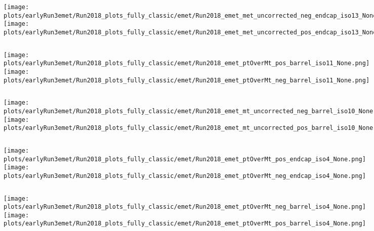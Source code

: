 \documentclass[en,16:9,navbarinfooter]{presentation/sdqbeamer}
\begin{document}
\begin{frame}{\insertsubsection}
   \begin{columns}
   \texttt{[image: plots/earlyRun3emet/Run2018\_plots\_fully\_classic/emet/Run2018\_emet\_met\_uncorrected\_neg\_endcap\_iso13\_None.png]}
   \texttt{[image: plots/earlyRun3emet/Run2018\_plots\_fully\_classic/emet/Run2018\_emet\_met\_uncorrected\_pos\_endcap\_iso13\_None.png]}
\end{columns}
\end{frame}

\begin{frame}{\insertsubsection}
   \begin{columns}
   \texttt{[image: plots/earlyRun3emet/Run2018\_plots\_fully\_classic/emet/Run2018\_emet\_ptOverMt\_pos\_barrel\_iso11\_None.png]}
   \texttt{[image: plots/earlyRun3emet/Run2018\_plots\_fully\_classic/emet/Run2018\_emet\_ptOverMt\_neg\_barrel\_iso11\_None.png]}
\end{columns}
\end{frame}

\begin{frame}{\insertsubsection}
   \begin{columns}
   \texttt{[image: plots/earlyRun3emet/Run2018\_plots\_fully\_classic/emet/Run2018\_emet\_mt\_uncorrected\_neg\_barrel\_iso10\_None.png]}
   \texttt{[image: plots/earlyRun3emet/Run2018\_plots\_fully\_classic/emet/Run2018\_emet\_mt\_uncorrected\_pos\_barrel\_iso10\_None.png]}
\end{columns}
\end{frame}

\begin{frame}{\insertsubsection}
   \begin{columns}
   \texttt{[image: plots/earlyRun3emet/Run2018\_plots\_fully\_classic/emet/Run2018\_emet\_ptOverMt\_pos\_endcap\_iso4\_None.png]}
   \texttt{[image: plots/earlyRun3emet/Run2018\_plots\_fully\_classic/emet/Run2018\_emet\_ptOverMt\_neg\_endcap\_iso4\_None.png]}
\end{columns}
\end{frame}

\begin{frame}{\insertsubsection}
   \begin{columns}
   \texttt{[image: plots/earlyRun3emet/Run2018\_plots\_fully\_classic/emet/Run2018\_emet\_ptOverMt\_neg\_barrel\_iso4\_None.png]}
   \texttt{[image: plots/earlyRun3emet/Run2018\_plots\_fully\_classic/emet/Run2018\_emet\_ptOverMt\_pos\_barrel\_iso4\_None.png]}
\end{columns}
\end{frame}
\end{document}
